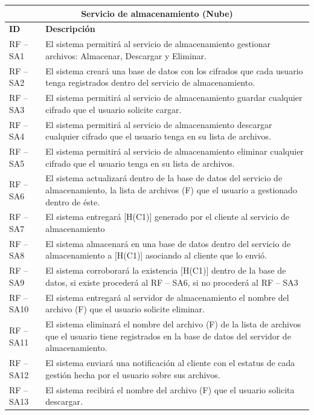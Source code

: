\begin{table}[htb]
\centering
\begin{tabular}{| p{2cm} |  p{13.5cm} |}
\hline
\multicolumn{2}{|c|}{\textbf{Servicio de almacenamiento (Nube)}} \\ \hline
\textbf{ID} &  \textbf{Descripción} \\
\hline \hline
RF – SA1 & El sistema permitirá al servicio de almacenamiento gestionar archivos: Almacenar, Descargar y Eliminar.\\ \hline
RF – SA2 & El sistema creará una base de datos con los cifrados que cada usuario tenga registrados dentro del servicio de almacenamiento.\\ \hline
RF – SA3 & El sistema permitirá al servicio de almacenamiento guardar cualquier cifrado que el usuario solicite cargar. \\ \hline
RF – SA4 & El sistema permitirá al servicio de almacenamiento descargar cualquier cifrado que el usuario tenga en su lista de archivos. \\ \hline
RF – SA5 & El sistema permitirá al servicio de almacenamiento eliminar cualquier cifrado que el usuario tenga en su lista de archivos. \\ \hline
RF – SA6 & El sistema actualizará dentro de la base de datos del servicio de almacenamiento, la lista de archivos (F) que el usuario a gestionado dentro de éste. \\ \hline
RF – SA7 & El sistema entregará [H(C1)] generado por el cliente al servicio de almacenamiento \\ \hline
RF – SA8 & El sistema almacenará en una base de datos dentro del servicio de almacenamiento a [H(C1)] asociando al cliente que lo envió. \\ \hline
RF – SA9 & El sistema corroborará la existencia [H(C1)] dentro de la base de datos, si existe procederá al RF – SA6,  si no procederá al RF – SA3\\ \hline
RF – SA10 & El sistema entregará al servidor de almacenamiento el nombre del archivo (F) que el usuario solicite eliminar.\\ \hline
RF – SA11 & El sistema eliminará el nombre del archivo (F) de la lista de archivos que el usuario tiene registrados en la base de datos del servidor de almacenamiento. \\ \hline
RF – SA12 & El sistema enviará una notificación al cliente con el estatus de cada gestión hecha por el usuario sobre sus archivos. \\ \hline
RF – SA13 & El sistema recibirá el nombre del archivo (F) que el usuario solicita descargar.\\ \hline

\end{tabular}
\end{table}
